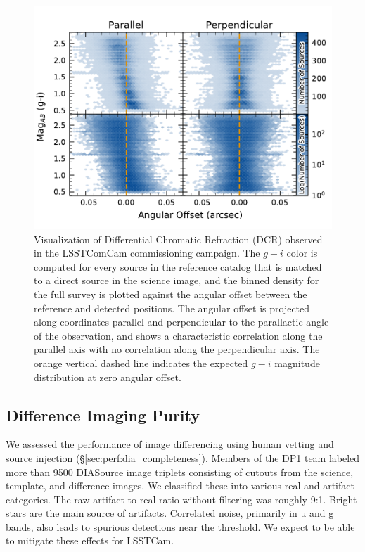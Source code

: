 \begin{figure}[htb!]
\centering
\includegraphics[width=0.98\linewidth]{dcrHexbin.pdf}
\caption{Visualization of \gls{Differential Chromatic Refraction} (DCR) observed in the LSSTComCam commissioning campaign. The $g-i$ color is computed for every source in the reference catalog that is matched to a direct source in the science image, and the binned density for the full survey is plotted against the angular offset between the reference and detected positions. The angular offset is projected along coordinates parallel and perpendicular to the parallactic angle of the observation, and shows a characteristic correlation along the parallel axis with no correlation along the perpendicular axis. The orange vertical dashed line indicates the expected $g-i$ magnitude distribution at zero angular offset.}
\label{fig:dcr}
\vspace{0.1cm}
\end{figure}


\subsection{Difference Imaging Purity} \label{sec:performance:dia}

We assessed the performance of image differencing using human vetting and source injection (\S \ref{sec:perf:dia_completeness}).
Members of the \gls{DP1} team labeled more than 9500 DIASource image triplets consisting of cutouts from the science, template, and difference images.
We classified these into various real and artifact categories.
The raw artifact to real ratio without filtering was roughly 9:1.
Bright stars are the main source of artifacts.
Correlated noise, primarily in u and g bands, also leads to spurious detections near the threshold.
We expect to be able to mitigate these effects for \gls{LSSTCam}.

